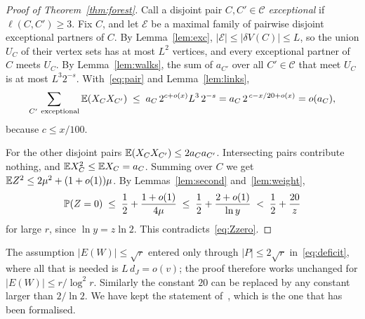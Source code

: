\begin{proof}[Proof of Theorem~\ref{thm:forest}]
Call a disjoint pair $C,C'\in\mathcal{C}$ \emph{exceptional} if $\ell(C,C')\ge3$. Fix $C$, and let
$\mathcal{E}$ be a maximal family of pairwise disjoint exceptional partners of $C$. By
Lemma~\ref{lem:exc}, $|\mathcal{E}|\le|\delta V(C)|\le L$, so the union $U_C$ of their vertex sets
has at most $L^{2}$ vertices, and every exceptional partner of $C$ meets $U_C$. By
Lemma~\ref{lem:walks}, the sum of $a_{C'}$ over all $C'\in\mathcal{C}$ that meet $U_C$ is at most
$L^{3}2^{-s}$. With~\eqref{eq:pair} and Lemma~\ref{lem:links},
\[
  \sum_{C'\ \mathrm{exceptional}}\EE(X_CX_{C'})\;\le\;a_C\,2^{c+o(x)}L^{3}\,2^{-s}
  =a_C\,2^{\,c-x/20+o(x)}=o(a_C),
\]
because $c\le x/100$.

For the other disjoint pairs $\mathbb{E}(X_CX_{C'})\le2a_Ca_{C'}$. Intersecting pairs contribute nothing,
and $\mathbb{E} X_C^{2}\le\mathbb{E} X_C=a_C$. Summing over $C$ we get
$\mathbb{E} Z^{2}\le2\mu^{2}+(1+o(1))\mu$. By Lemmas~\ref{lem:second} and~\ref{lem:weight},
\[
  \mathbb{P}(Z=0)\;\le\;\frac12+\frac{1+o(1)}{4\mu}\;\le\;\frac12+\frac{2+o(1)}{\ln y}\;<\;\frac12+\frac{20}{z}
\]
for large $r$, since $\ln y=z\ln2$. This contradicts~\eqref{eq:Zzero}.
\end{proof}

\begin{remark}\label{rem:range}
The assumption $|E(W)|\le\sqrt r$ entered only through $|P|\le2\sqrt r$ in~\eqref{eq:deficit}, where
all that is needed is $L\,d_J=o(v)$; the proof therefore works unchanged for
$|E(W)|\le r/\log^{2}r$. Similarly the constant $20$ can be replaced by any constant larger than
$2/\ln2$. We have kept the statement of~\cite{KNT}, which is the one that has been formalised.
\end{remark}
